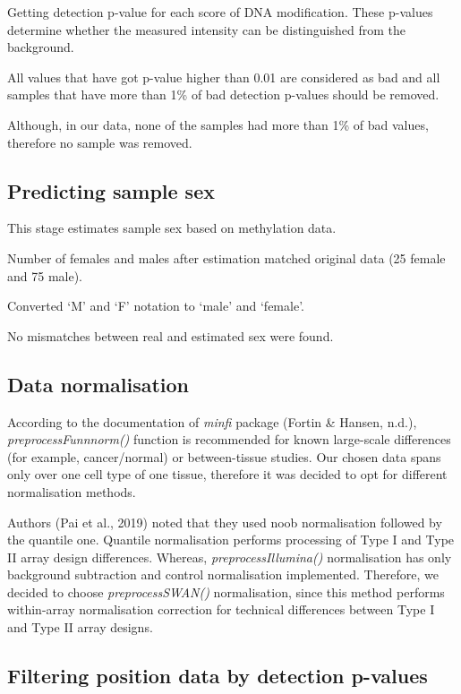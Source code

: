 \documentclass[
]{article}
\begin{document}
Getting detection p-value for each score of DNA modification. These
p-values determine whether the measured intensity can be distinguished
from the background.

All values that have got p-value higher than 0.01 are considered as bad
and all samples that have more than 1\% of bad detection p-values should
be removed.

Although, in our data, none of the samples had more than 1\% of bad
values, therefore no sample was removed.

\hypertarget{predicting-sample-sex}{%
\subsection{Predicting sample sex}\label{predicting-sample-sex}}

This stage estimates sample sex based on methylation data.

Number of females and males after estimation matched original data (25
female and 75 male).

Converted `M' and `F' notation to `male' and `female'.

No mismatches between real and estimated sex were found.

\hypertarget{data-normalisation}{%
\subsection{Data normalisation}\label{data-normalisation}}

According to the documentation of \emph{minfi} package (Fortin \&
Hansen, n.d.), \emph{preprocessFunnnorm()} function is recommended for
known large-scale differences (for example, cancer/normal) or
between-tissue studies. Our chosen data spans only over one cell type of
one tissue, therefore it was decided to opt for different normalisation
methods.

Authors (Pai et al., 2019) noted that they used noob normalisation
followed by the quantile one. Quantile normalisation performs processing
of Type I and Type II array design differences. Whereas,
\emph{preprocessIllumina()} normalisation has only background
subtraction and control normalisation implemented. Therefore, we decided
to choose \emph{preprocessSWAN()} normalisation, since this method
performs within-array normalisation correction for technical differences
between Type I and Type II array designs.

\hypertarget{filtering-position-data-by-detection-p-values}{%
\subsection{Filtering position data by detection
p-values}\label{filtering-position-data-by-detection-p-values}}
\end{document}

